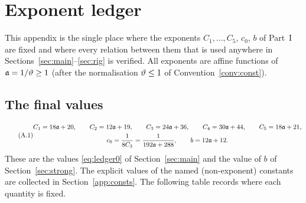 \section{Exponent ledger}\label{app:ledger}
This appendix is the single place where the exponents $C_1,\dots,C_5$, $c_0$, $b$ of Part~I are fixed and where every relation between them that is used anywhere in Sections~\ref{sec:main}--\ref{sec:rig} is verified.
All exponents are affine functions of $\mathfrak{a}=1/\vartheta\ge1$ (after the normalisation $\vartheta\le1$ of Convention~\ref{conv:const}).

\subsection{The final values}\label{app:values}
\begin{equation}\tag{A.1}\label{eq:a5-ledger}
\begin{gathered}
 C_1=18\mathfrak{a}+20,\qquad C_2=12\mathfrak{a}+19,\qquad C_3=24\mathfrak{a}+36,\qquad C_4=30\mathfrak{a}+44,\qquad C_5=18\mathfrak{a}+21,\\
 c_0=\frac1{8C_3}=\frac1{192\mathfrak{a}+288},\qquad b=12\mathfrak{a}+12 .
\end{gathered}
\end{equation}
These are the values \eqref{eq:ledger0} of Section~\ref{sec:main} and the value of $b$ of Section~\ref{sec:strong}. The explicit values of the named (non-exponent) constants are collected in Section~\ref{app:consts}.
The following table records where each quantity is fixed.

